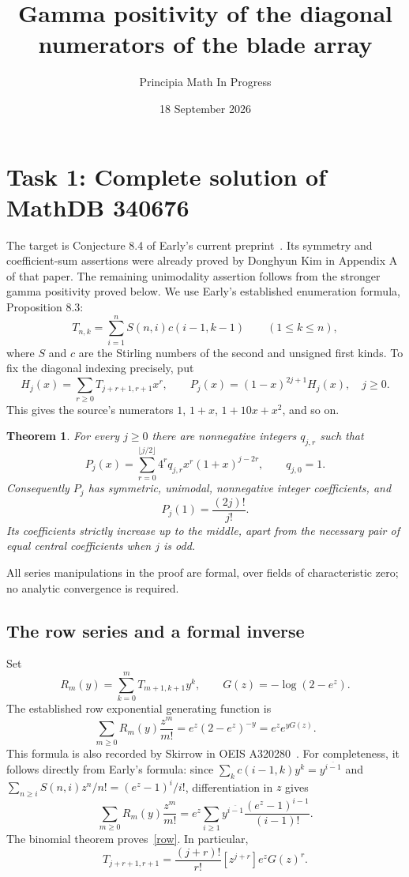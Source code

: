 \documentclass[11pt]{article}
\title{Gamma positivity of the diagonal numerators of the blade array}
\author{Principia Math In Progress}
\date{18 September 2026}
\newtheorem{theorem}{Theorem}
\begin{document}
\maketitle

\section*{Task 1: Complete solution of MathDB 340676}
The target is Conjecture 8.4 of Early's current preprint~\cite{Early}.
Its symmetry and coefficient-sum assertions were already proved by Donghyun
Kim in Appendix A of that paper. The remaining unimodality assertion follows
from the stronger gamma positivity proved below. We use Early's established
enumeration formula, Proposition 8.3:
\[
 T_{n,k}=\sum_{i=1}^n S(n,i)c(i-1,k-1) \qquad(1\leq k\leq n),
\]
where $S$ and $c$ are the Stirling numbers of the second and unsigned first
kinds. To fix the diagonal indexing precisely, put
\[
 H_j(x)=\sum_{r\geq0}T_{j+r+1,r+1}x^r,
 \qquad P_j(x)=(1-x)^{2j+1}H_j(x),\quad j\geq0.
\]
This gives the source's numerators $1$, $1+x$, $1+10x+x^2$, and so on.

\begin{theorem}\label{main}
For every $j\geq0$ there are nonnegative integers $q_{j,r}$ such that
\begin{equation}\label{gamma}
 P_j(x)=\sum_{r=0}^{\lfloor j/2\rfloor}
           4^r q_{j,r}x^r(1+x)^{j-2r},\qquad q_{j,0}=1.
\end{equation}
Consequently $P_j$ has symmetric, unimodal, nonnegative integer
coefficients, and
\[
 P_j(1)=\frac{(2j)!}{j!}.
\]
Its coefficients strictly increase up to the middle, apart from the
necessary pair of equal central coefficients when $j$ is odd.
\end{theorem}

All series manipulations in the proof are formal, over fields of
characteristic zero; no analytic convergence is required.

\subsection*{The row series and a formal inverse}
Set
\[
 R_m(y)=\sum_{k=0}^m T_{m+1,k+1}y^k,\qquad
 G(z)=-\log(2-e^z).
\]
The established row exponential generating function is
\begin{equation}\label{row}
 \sum_{m\geq0}R_m(y)\frac{z^m}{m!}=e^z(2-e^z)^{-y}=e^ze^{yG(z)}.
\end{equation}
This formula is also recorded by Skirrow in OEIS A320280~\cite{OEIS}.
For completeness, it follows directly from Early's formula: since
$\sum_k c(i-1,k)y^k=y^{\overline{i-1}}$ and
$\sum_{n\geq i}S(n,i)z^n/n!=(e^z-1)^i/i!$, differentiation in $z$ gives
\[
 \sum_{m\geq0}R_m(y)\frac{z^m}{m!}
 =e^z\sum_{i\geq1}y^{\overline{i-1}}
                    \frac{(e^z-1)^{i-1}}{(i-1)!}.
\]
The binomial theorem proves~\eqref{row}. In particular,
\begin{equation}\label{entry}
 T_{j+r+1,r+1}=\frac{(j+r)!}{r!}[z^{j+r}]e^zG(z)^r.
\end{equation}
\end{document}
